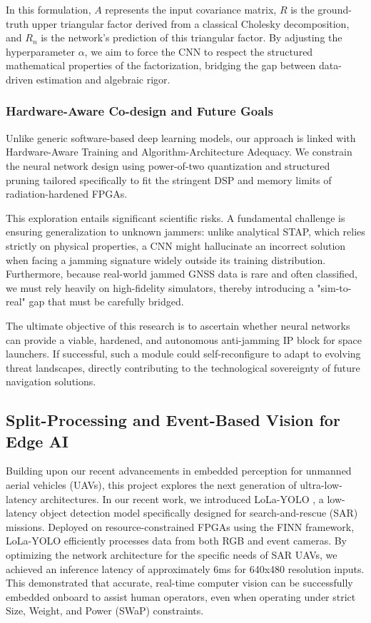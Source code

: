 \documentclass[11pt]{report}
\begin{document}
In this formulation, $A$ represents the input covariance matrix, $R$ is the ground-truth upper triangular factor derived from a classical Cholesky decomposition, and $R_n$ is the network's prediction of this triangular factor. By adjusting the hyperparameter $\alpha$, we aim to force the CNN to respect the structured mathematical properties of the factorization, bridging the gap between data-driven estimation and algebraic rigor.

\subsubsection{Hardware-Aware Co-design and Future Goals}
Unlike generic software-based deep learning models, our approach is linked with Hardware-Aware Training and Algorithm-Architecture Adequacy. We constrain the neural network design using power-of-two quantization and structured pruning tailored specifically to fit the stringent DSP and memory limits of radiation-hardened FPGAs.

This exploration entails significant scientific risks. A fundamental challenge is ensuring generalization to unknown jammers: unlike analytical STAP, which relies strictly on physical properties, a CNN might hallucinate an incorrect solution when facing a jamming signature widely outside its training distribution. Furthermore, because real-world jammed GNSS data is rare and often classified, we must rely heavily on high-fidelity simulators, thereby introducing a "sim-to-real" gap that must be carefully bridged.

The ultimate objective of this research is to ascertain whether neural networks can provide a viable, hardened, and autonomous anti-jamming IP block for space launchers. If successful, such a module could self-reconfigure to adapt to evolving threat landscapes, directly contributing to the technological sovereignty of future navigation solutions.
\subsection{Split-Processing and Event-Based Vision for Edge AI}

Building upon our recent advancements in embedded perception for unmanned aerial vehicles (UAVs), this project explores the next generation of ultra-low-latency architectures. In our recent work, we introduced LoLa-YOLO \cite{amessegher2025towards}, a low-latency object detection model specifically designed for search-and-rescue (SAR) missions. Deployed on resource-constrained FPGAs using the FINN framework, LoLa-YOLO efficiently processes data from both RGB and event cameras. By optimizing the network architecture for the specific needs of SAR UAVs, we achieved an inference latency of approximately 6ms for 640x480 resolution inputs. This demonstrated that accurate, real-time computer vision can be successfully embedded onboard to assist human operators, even when operating under strict Size, Weight, and Power (SWaP) constraints.
\end{document}
